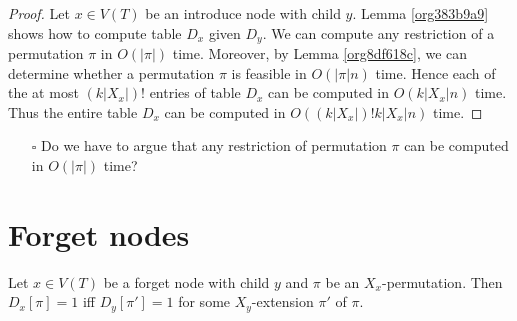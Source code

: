 \documentclass[fontsize=11pt,paper=a4]{book}
\begin{document}
\begin{proof}
Let \(x\in V(T)\) be an introduce node with child \(y\).
Lemma \ref{org383b9a9} shows how to compute table \(D_x\) given \(D_y\).
We can compute any restriction of a permutation \(\pi\) in \(O(\lvert\pi\rvert)\) time.
Moreover, by Lemma \ref{org8df618c}, we can determine whether a permutation \(\pi\) is feasible in \(O(\lvert\pi\rvert n)\) time.
Hence each of the at most \((k\lvert X_x\rvert)!\) entries of table \(D_x\) can be computed in \(O(k\lvert X_x\rvert n)\) time.
Thus the entire table \(D_x\) can be computed in \(O((k\lvert X_x\rvert)!k\lvert X_x\rvert n)\) time.
\end{proof}

\begin{itemize}
\item[{$\square$}] Do we have to argue that any restriction of permutation \(\pi\) can be computed in \(O(\lvert\pi\rvert)\) time?
\end{itemize}

\section{Forget nodes}
\label{sec:org679fcf9}

\begin{lem}
Let \(x\in V(T)\) be a forget node with child \(y\) and \(\pi\) be an \(X_x\)-permutation. Then \(D_x[\pi]=1\) iff \(D_y[\pi']=1\) for some \(X_y\)-extension \(\pi'\) of \(\pi\).
\label{org5a7aa88}
\end{lem}
\end{document}
